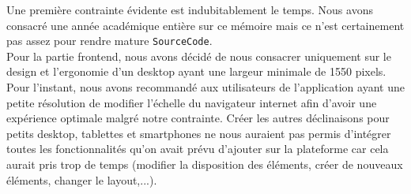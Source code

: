 Une première contrainte évidente est indubitablement le temps. Nous avons consacré une année académique entière sur ce mémoire mais ce n'est certainement pas assez pour rendre mature \texttt{SourceCode}.\\

Pour la partie \gls{frontend}, nous avons décidé de nous consacrer uniquement sur le design et l'ergonomie d'un desktop ayant une largeur minimale de 1550 pixels. Pour l'instant, nous avons recommandé aux utilisateurs de l'application ayant une petite résolution de modifier l'échelle du navigateur internet afin d'avoir une expérience optimale malgré notre contrainte. Créer les autres déclinaisons pour petits desktop, tablettes et smartphones ne nous auraient pas permis d'intégrer toutes les fonctionnalités qu'on avait prévu d'ajouter sur la plateforme car cela aurait pris trop de temps (modifier la disposition des éléments, créer de nouveaux éléments, changer le layout,...).


